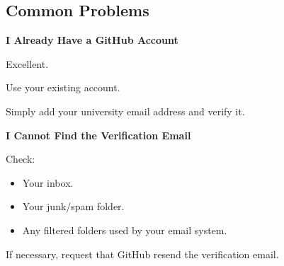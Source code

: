 \documentclass{csc2059practical}
\begin{document}
\subsection{Common Problems}
\begin{commonerror}
\textbf{I Already Have a GitHub Account}\par
\medskip

Excellent.


Use your existing account.


Simply add your university email address and verify it.


\end{commonerror}
\begin{commonerror}
\textbf{I Cannot Find the Verification Email}\par
\medskip

Check:


\begin{itemize}
  \item Your inbox.
  \item Your junk/spam folder.
  \item Any filtered folders used by your email system.
\end{itemize}
If necessary, request that GitHub resend the verification email.
\end{commonerror}
\end{document}
